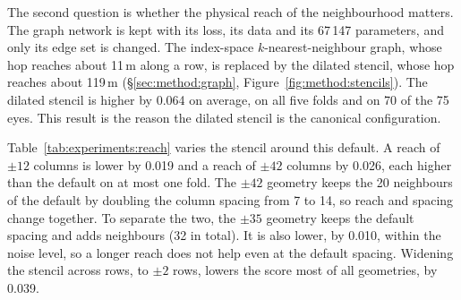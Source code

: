 The second question is whether the physical reach of the neighbourhood
matters. The graph network is kept with its loss, its data and its
67\,147 parameters, and only its edge set is changed. The index-space
$k$-nearest-neighbour graph, whose hop reaches about 11\,\textmu{}m along a
row, is replaced by the dilated stencil, whose hop reaches about
119\,\textmu{}m (\S\ref{sec:method:graph},
Figure~\ref{fig:method:stencils}). The dilated stencil is higher by 0.064
on average, on all five folds and on 70 of the 75 eyes. This result is the
reason the dilated stencil is the canonical configuration.

Table~\ref{tab:experiments:reach} varies the stencil around this default.
A reach of $\pm 12$ columns is lower by 0.019 and a reach of $\pm 42$
columns by 0.026, each higher than the default on at most one fold. The
$\pm 42$ geometry keeps the 20 neighbours of the default by doubling the
column spacing from 7 to 14, so reach and spacing change together. To
separate the two, the $\pm 35$ geometry keeps the default spacing and adds
neighbours (32 in total). It is also lower, by 0.010, within the noise
level, so a longer reach does not help even at the default spacing.
Widening the stencil across rows, to $\pm 2$ rows, lowers the score most of
all geometries, by 0.039.

